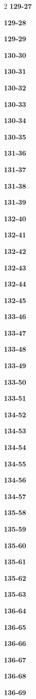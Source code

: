 \documentclass[10pt,a4paper]{article}
\begin{document}
\begin{multicols}{2}
\noindent\textbf{129-27}\ \par
\noindent\textbf{129-28}\ \par
\noindent\textbf{129-29}\ \par
\noindent\textbf{130-30}\ \par
\noindent\textbf{130-31}\ \par
\noindent\textbf{130-32}\ \par
\noindent\textbf{130-33}\ \par
\noindent\textbf{130-34}\ \par
\noindent\textbf{130-35}\ \par
\noindent\textbf{131-36}\ \par
\noindent\textbf{131-37}\ \par
\noindent\textbf{131-38}\ \par
\noindent\textbf{131-39}\ \par
\noindent\textbf{132-40}\ \par
\noindent\textbf{132-41}\ \par
\noindent\textbf{132-42}\ \par
\noindent\textbf{132-43}\ \par
\noindent\textbf{132-44}\ \par
\noindent\textbf{132-45}\ \par
\noindent\textbf{133-46}\ \par
\noindent\textbf{133-47}\ \par
\noindent\textbf{133-48}\ \par
\noindent\textbf{133-49}\ \par
\noindent\textbf{133-50}\ \par
\noindent\textbf{133-51}\ \par
\noindent\textbf{134-52}\ \par
\noindent\textbf{134-53}\ \par
\noindent\textbf{134-54}\ \par
\noindent\textbf{134-55}\ \par
\noindent\textbf{134-56}\ \par
\noindent\textbf{134-57}\ \par
\noindent\textbf{135-58}\ \par
\noindent\textbf{135-59}\ \par
\noindent\textbf{135-60}\ \par
\noindent\textbf{135-61}\ \par
\noindent\textbf{135-62}\ \par
\noindent\textbf{135-63}\ \par
\noindent\textbf{136-64}\ \par
\noindent\textbf{136-65}\ \par
\noindent\textbf{136-66}\ \par
\noindent\textbf{136-67}\ \par
\noindent\textbf{136-68}\ \par
\noindent\textbf{136-69}\ \par
\end{multicols}
\end{document}
